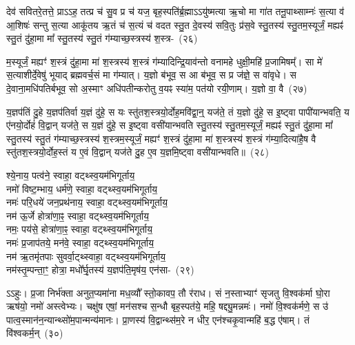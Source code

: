 {\anuvakamend[{ते॒ पृ॒ष॒दा॒ज्यं प्रा॒णो वै योनेः᳚ प्रा॒णं द्वाविꣳ॑शतिश्च}]}

देव॑ सवितरे॒तत्ते॒ प्रा\-ऽऽ\-ह॒ तत्प्र च॑ सु॒व प्र च॑ यज॒ बृह॒स्पति॑र्ब्र॒ह्मा\-ऽऽ\-यु॑ष्मत्या ऋ॒चो मा गा॑त तनू॒पाथ्साम्नः॑ स॒त्या व॑ आ॒शिषः॑ सन्तु स॒त्या आकू॑तय ऋ॒तं च॑ स॒त्यं च॑ वदत स्तु॒त दे॒वस्य॑ सवि॒तुः प्र॑स॒वे स्तु॒तस्य॑ स्तु॒तम॒स्यूर्जं॒ मह्यꣴ॑ स्तु॒तं दु॑हा॒मा मा᳚ स्तु॒तस्य॑ स्तु॒तं ग॑म्याच्छ॒स्त्रस्य॑ श॒स्त्र-~(२६)\ip

म॒स्यूर्जं॒ मह्यꣳ॑ श॒स्त्रं दु॑हा॒मा मा॑ श॒स्त्रस्य॑ श॒स्त्रं ग॑म्यादिन्द्रि॒याव॑न्तो वनामहे धुक्षी॒महि॑ प्र॒जामिषम्᳚। सा मे॑ स॒त्याशीर्दे॒वेषु॑ भूयाद् ब्रह्मवर्च॒सं मा ग॑म्यात्। य॒ज्ञो ब॑भूव॒ स आ ब॑भूव॒ स प्र ज॑ज्ञे॒ स वा॑वृधे। स दे॒वाना॒मधि॑\-पतिर्बभूव॒ सो अ॒स्माꣳ अधि॑पतीन्करोतु व॒यꣴ स्या॑म॒ पत॑यो रयी॒णाम्। य॒ज्ञो वा॒ वै~(२७)\ip

य॒ज्ञप॑तिं दु॒हे य॒ज्ञप॑तिर्वा य॒ज्ञं दु॑हे॒ स यः स्तु॑तश॒स्त्रयो॒र्दोह॒म\-वि॑द्वा॒न्॒ यज॑ते॒ तं य॒ज्ञो दु॑हे॒ स इ॒ष्ट्वा पापी॑यान्भवति॒ य ए॑नयो॒र्दोहं॑ वि॒द्वान् यज॑ते॒ स य॒ज्ञं दु॑हे॒ स इ॒ष्ट्वा वसी॑यान्भवति स्तु॒तस्य॑ स्तु॒तम॒स्यूर्जं॒ मह्यꣴ॑ स्तु॒तं दु॑हा॒मा मा᳚ स्तु॒तस्य॑ स्तु॒तं ग॑म्याच्छ॒स्त्रस्य॑ श॒स्त्रम॒स्यूर्जं॒ मह्यꣳ॑ श॒स्त्रं दु॑हा॒मा मा॑ श॒स्त्रस्य॑ श॒स्त्रं ग॑म्या॒दित्या॑है॒ष वै स्तु॑तश॒स्त्रयो॒र्दोह॒स्तं य ए॒वं वि॒द्वान् यज॑ते दु॒ह ए॒व य॒ज्ञमि॒ष्ट्वा वसी॑यान्भवति॥~(२८)\ip

{\anuvakamend[{श॒स्त्रं वै श॒स्त्रन्दु॑हा॒न्द्वाविꣳ॑शतिश्च}]}

श्ये॒नाय॒ पत्व॑ने॒ स्वाहा॒ वट्थ्स्व॒य\-म॑भि\-गूर्ताय॒\\
नमो॑ विष्ट॒म्भाय॒ धर्म॑णे॒ स्वाहा॒ वट्थ्स्व॒य\-म॑भि\-गूर्ताय॒\\
नमः॑ परि॒धये॑ जन॒प्रथ॑नाय॒ स्वाहा॒ वट्थ्स्व॒य\-म॑भि\-गूर्ताय॒\\
नम॑ ऊ॒र्जे होत्रा॑णा॒ꣴ॒ स्वाहा॒ वट्थ्स्व॒य\-म॑भि\-गूर्ताय॒\\
नमः॒ पय॑से॒ होत्रा॑णा॒ꣴ॒ स्वाहा॒ वट्थ्स्व॒य\-म॑भि\-गूर्ताय॒\\
नमः॑ प्र॒जा\-प॑तये॒ मन॑वे॒ स्वाहा॒ वट्थ्स्व॒य\-म॑भि\-गूर्ताय॒\\
नम॑ ऋ॒तमृ॑तपाः सुवर्वा॒ट्थ्\-स्वाहा॒ वट्थ्स्व॒य\-म॑भि\-गूर्ताय॒\\
नम॑स्तृ॒म्पन्ता॒ꣳ॒ होत्रा॒ मधो᳚र्घृ॒तस्य॑ य॒ज्ञप॑ति॒मृष॑य॒ एन॑सा-~(२९)\ip

ऽऽहुः। प्र॒जा निर्भ॑क्ता अनुत॒प्यमा॑ना मध॒व्यौ᳚ स्तो॒कावप॒ तौ र॑राध। सं न॒स्ताभ्याꣳ॑ सृजतु वि॒श्वक॑र्मा घो॒रा ऋष॑यो॒ नमो॑ अस्त्वेभ्यः। चक्षु॑ष एषां॒ मन॑सश्च स॒न्धौ बृह॒स्पत॑ये॒ महि॒ षद्द्यु॒मन्नमः॑। नमो॑ वि॒श्वक॑र्मणे॒ स उ॑ पात्व॒स्मान॑न॒न्यान्थ्सो॑म॒पान्मन्य॑मानः। प्रा॒णस्य॑ वि॒द्वान्थ्स॑म॒रे न धीर॒ एन॑श्चकृ॒वान्महि॑ ब॒द्ध ए॑षाम्। तं वि॑श्वकर्म॒न्~(३०)\ip

